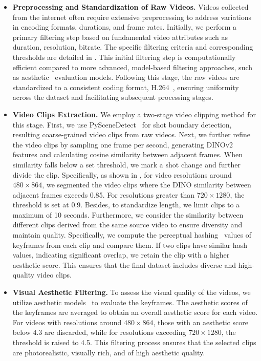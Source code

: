 \begin{itemize}[align=parleft, left=0pt, labelsep=0.5em]
    \item \textbf{Preprocessing and Standardization of Raw Videos.} Videos collected from the internet often require extensive preprocessing to address variations in encoding formats, durations, and frame rates. Initially, we perform a primary filtering step based on fundamental video attributes such as duration, resolution, bitrate. The specific filtering criteria and corresponding thresholds are detailed in . This initial filtering step is computationally efficient compared to more advanced, model-based filtering approaches, such as aesthetic~\citep{schuhmann2022laion} evaluation models. Following this stage, the raw videos are standardized to a consistent coding format, H.264~\citep{wiegand2003overview}, ensuring uniformity across the dataset and facilitating subsequent processing stages.
    
    \item \textbf{Video Clips Extraction.}
     We employ a two-stage video clipping method for this stage. First, we use PySceneDetect~\citep{Castellano_PySceneDetect} for shot boundary detection, resulting coarse-grained video clips from raw videos. Next, we further refine the video clips by sampling one frame per second, generating DINOv2~\citep{oquab2023dinov2} features and calculating cosine similarity between adjacent frames. When similarity falls below a set threshold, we mark a shot change and further divide the clip. Specifically, as shown in , for video resolutions around $480 \times 864$, we segmented the video clips where the DINO similarity between adjacent frames exceeds 0.85. For resolutions greater than $720 \times 1280$, the threshold is set at 0.9.
    Besides, to standardize length, we limit clips to a maximum of 10 seconds. Furthermore, we consider the similarity between different clips derived from the same source video to ensure diversity and maintain quality. Specifically, we compute the perceptual hashing~\citep{imagehash} values of keyframes from each clip and compare them. If two clips have similar hash values, indicating significant overlap, we retain the clip with a higher aesthetic score. This ensures that the final dataset includes diverse and high-quality video clips.
    
    \item \textbf{Visual Aesthetic Filtering.} To assess the visual quality of the videos, we utilize aesthetic models~\citep{schuhmann2022laion} to evaluate the keyframes. The aesthetic scores of the keyframes are averaged to obtain an overall aesthetic score for each video. For videos with resolutions around $480 \times 864$, those with an aesthetic score below 4.3 are discarded, while for resolutions exceeding $720 \times 1280$, the threshold is raised to 4.5. This filtering process ensures that the selected clips are photorealistic, visually rich, and of high aesthetic quality.
    

\end{itemize}
